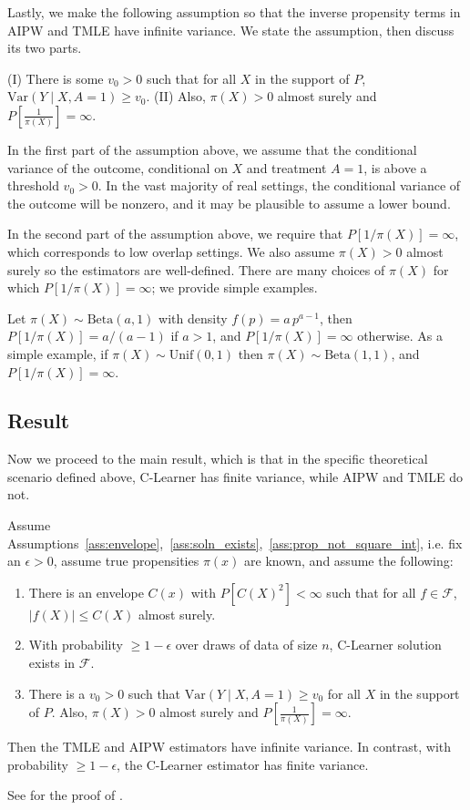 Lastly, we make the following assumption so that the inverse propensity terms in AIPW and TMLE have infinite variance. We state the assumption, then discuss its two parts. 
\begin{assumption}
\label{ass:prop_not_square_int}
(I) There is some $v_0>0$ such that 
for all $X$ in the support of $P$, $\text{Var}(Y\mid X, A=1)\geq v_0.$ (II) Also, $\pi(X)>0$ almost surely and
$P\left[\frac{1}{ \pi(X)}\right]=\infty.$
\end{assumption}
In the first part of the assumption above, we assume that the conditional variance of the outcome, conditional on $X$ and treatment $A=1$, is above a threshold $v_0>0$. In the vast majority of real settings, the conditional variance of the outcome will be nonzero, and it may be plausible to assume a lower bound.

In the second part of the assumption above, we require that 
$P[1/\pi(X)]=\infty$, which corresponds to low overlap settings.
We also assume $\pi(X)>0$ almost surely so the estimators are well-defined. %
There are many choices of $\pi(X)$ for which $P[1/\pi(X)]=\infty$; we provide simple examples. %


\begin{example}[Beta $\pi(X)$]
Let $\pi(X)\sim \text{Beta}(a,1)$ with density
$f(p)=a\,p^{a-1}$, then $P[1/\pi(X)]=a/(a-1)$ if $a>1$, and $P[1/\pi(X)]=\infty$ otherwise. 
As a simple example, if $\pi(X)\sim\text{Unif}(0,1)$ then $\pi(X)\sim\text{Beta}(1,1)$, and $P[1/\pi(X)]=\infty$. 
\end{example}
\subsection{Result}
Now we proceed to the main result, which is that in the specific theoretical scenario defined above, C-Learner has finite variance, while AIPW and TMLE do not. 
\begin{theorem}
\label{thm:simple_variance}
Assume Assumptions~\ref{ass:envelope},~\ref{ass:soln_exists},~\ref{ass:prop_not_square_int}, 
i.e. fix an $\epsilon>0$, assume true propensities $\pi(x)$ are known, and assume the following:
\begin{enumerate}
    \item There is an envelope $C(x)$ with  $P[C(X)^2]<\infty$ such that for all $f\in \mathcal F$, $|f(X)|\leq C(X)$ almost surely. 
    \item With probability $\geq 1-\epsilon$ over draws of data of size $n$,  C-Learner solution exists in $\mathcal F$.
\item There is a $v_0>0$ such that 
$\text{Var}(Y\mid X, A=1)\geq v_0$
for all $X$ in the support of $P$. Also, $\pi(X)>0$ almost surely and
$P\left[\frac{1}{ \pi(X)}\right]=\infty$.
\end{enumerate}
Then the TMLE and AIPW estimators have infinite variance. In contrast, 
with probability $\geq 1-\epsilon$,
the C-Learner estimator has finite variance. 
\end{theorem}
See  for the proof of . 

\label{sec:theory_simple-end}
